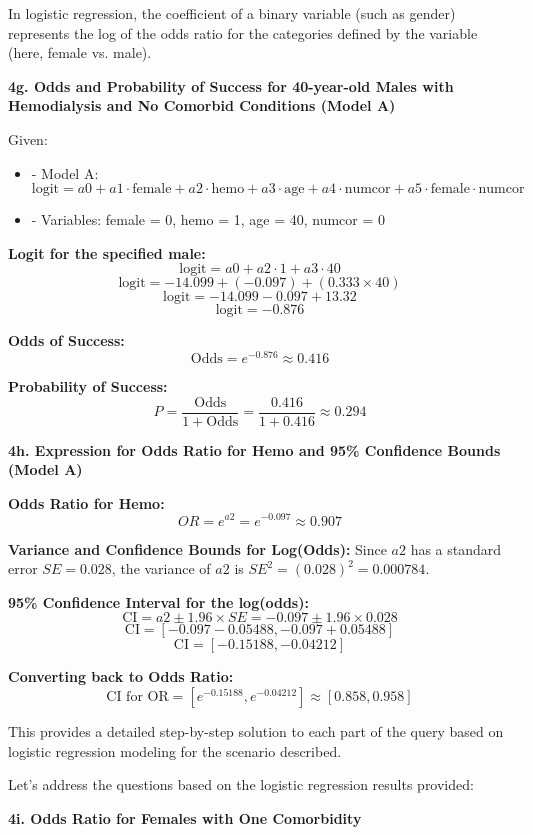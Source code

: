 \documentclass{article}
\begin{document}
In logistic regression, the coefficient of a binary variable (such as gender) represents the log of the odds ratio for the categories defined by the variable (here, female vs. male).

\textbf{4g. Odds and Probability of Success for 40-year-old Males with Hemodialysis and No Comorbid Conditions (Model A)}

Given:
\begin{itemize}
    \item - Model A: \( \text{logit} = a0 + a1 \cdot \text{female} + a2 \cdot \text{hemo} + a3 \cdot \text{age} + a4 \cdot \text{numcor} + a5 \cdot \text{female} \cdot \text{numcor} \)
    \item - Variables: female = 0, hemo = 1, age = 40, numcor = 0
\end{itemize}

\textbf{Logit for the specified male:}
\[ \text{logit} = a0 + a2 \cdot 1 + a3 \cdot 40 \]
\[ \text{logit} = -14.099 + (-0.097) + (0.333 \times 40) \]
\[ \text{logit} = -14.099 - 0.097 + 13.32 \]
\[ \text{logit} = -0.876 \]

\textbf{Odds of Success:}
\[ \text{Odds} = e^{-0.876} \approx 0.416 \]

\textbf{Probability of Success:}
\[ P = \frac{\text{Odds}}{1 + \text{Odds}} = \frac{0.416}{1 + 0.416} \approx 0.294 \]

\textbf{4h. Expression for Odds Ratio for Hemo and 95\% Confidence Bounds (Model A)}

\textbf{Odds Ratio for Hemo:}
\[ OR = e^{a2} = e^{-0.097} \approx 0.907 \]

\textbf{Variance and Confidence Bounds for Log(Odds):}
Since \(a2\) has a standard error \(SE = 0.028\), the variance of \(a2\) is \(SE^2 = (0.028)^2 = 0.000784\).

\textbf{95\% Confidence Interval for the log(odds):}
\[ \text{CI} = a2 \pm 1.96 \times SE = -0.097 \pm 1.96 \times 0.028 \]
\[ \text{CI} = [-0.097 - 0.05488, -0.097 + 0.05488] \]
\[ \text{CI} = [-0.15188, -0.04212] \]

\textbf{Converting back to Odds Ratio:}
\[ \text{CI for OR} = [e^{-0.15188}, e^{-0.04212}] \approx [0.858, 0.958] \]

This provides a detailed step-by-step solution to each part of the query based on logistic regression modeling for the scenario described.

Let's address the questions based on the logistic regression results provided:

\textbf{4i. Odds Ratio for Females with One Comorbidity}
\end{document}
